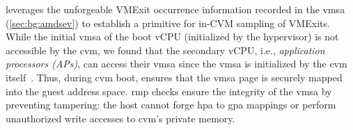\thename leverages the unforgeable VMExit occurrence information recorded in the \gls{vmsa} (\cref{sec:bg:amdsev}) to establish a primitive for in-CVM sampling of VMExits.
While the initial \gls{vmsa} of the boot vCPU (initialized by the hypervisor) is not accessible by the \gls{cvm}, we found that the secondary vCPU, i.e., \emph{application processors (APs)}, can access their \gls{vmsa} since the \gls{vmsa} is initialized by the \gls{cvm} itself~\cite{amd64}.
Thus, during \gls{cvm} boot, \thename ensures that the \gls{vmsa} page is securely mapped into the guest address space.
\gls{rmp} checks ensure the integrity of the \gls{vmsa} by preventing tampering: the host cannot forge \gls{hpa} to \gls{gpa} mappings or perform unauthorized write accesses to \gls{cvm}'s private memory.






